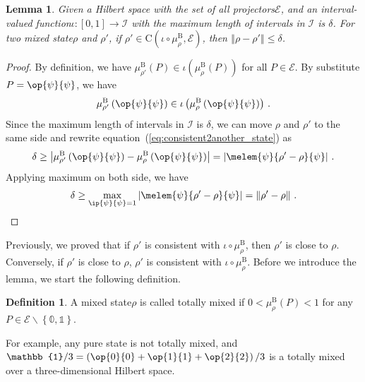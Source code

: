 \documentclass[12pt]{iopart}
\theoremstyle{plain}
\newtheorem{lemma}[thm]{Lemma}
\theoremstyle{definition}
\newtheorem{definition}[thm]{Definition}
\theoremstyle{remark}
\newcommand{\events}{\ensuremath{\mathcal{E}}}
\newcommand{\proj}[1]{\op{#1}{#1}}
\newcommand{\coreBorn}{\ensuremath{\mathrm{C}}}
\newcommand{\nb}{\nolinebreak[3] }
\begin{document}
\begin{lemma}Given a Hilbert space with the set of all projectors\nb$\events$,
and an interval-valued function\nb$\iota:\left[0,1\right]\rightarrow\mathscr{I}$
with the maximum length of intervals in $\mathscr{I}$ is $\delta$.
For two mixed state\nb$\rho$ and $\rho'$, if $\rho'\in\coreBorn\left(\iota\circ\mu_{\rho}^{\mathrm{B}},\events\right)$,
then $\left\Vert \rho-\rho'\right\Vert \le\delta$.\end{lemma}

\begin{proof}By definition, we have $\mu_{\rho'}^{\mathrm{B}}\left(P\right)\in\iota\left(\mu_{\rho}^{\mathrm{B}}\left(P\right)\right)$
for all $P\in\events$. By substitute $P=\proj{\psi}$, we have 
\begin{equation}
\mu_{\rho'}^{\mathrm{B}}\left(\proj{\psi}\right)\in\iota\left(\mu_{\rho}^{\mathrm{B}}\left(\proj{\psi}\right)\right)\,.\label{eq:consistent2another_state}
\end{equation}
Since the maximum length of intervals in $\mathscr{I}$ is $\delta$,
we can move $\rho$ and $\rho'$ to the same side and rewrite equation~(\ref{eq:consistent2another_state})
as
\begin{equation}
\delta\ge\left|\mu_{\rho'}^{\mathrm{B}}\left(\proj{\psi}\right)-\mu_{\rho}^{\mathrm{B}}\left(\proj{\psi}\right)\right|=\left|\melem{\psi}{\rho'-\rho}{\psi}\right|\,.
\end{equation}
Applying maximum on both side, we have
\begin{equation}
\delta\ge\max_{\ip{\psi}{\psi}=1}\left|\melem{\psi}{\rho'-\rho}{\psi}\right|=\left\Vert \rho'-\rho\right\Vert \,.
\end{equation}
\end{proof}

Previously, we proved that if $\rho'$ is consistent with $\iota\circ\mu_{\rho}^{\mathrm{B}}$,
then $\rho'$ is close to $\rho$. Conversely, if $\rho'$ is close
to $\rho$, $\rho'$ is consistent with $\iota\circ\mu_{\rho}^{\mathrm{B}}$.
Before we introduce the lemma, we start the following definition.

\begin{definition}A mixed state\nb$\rho$ is called totally mixed
if $0<\mu_{\rho}^{\mathrm{B}}\left(P\right)<1$ for any $P\in\events\backslash\left\{ \mathbb{0},\mathbb{1}\right\} $.\end{definition}

For example, any pure state is not totally mixed, and $\mathbb{1}/3=\left(\proj{0}+\proj{1}+\proj{2}\right)/3$
is a totally mixed over a three-dimensional Hilbert space.
\end{document}
